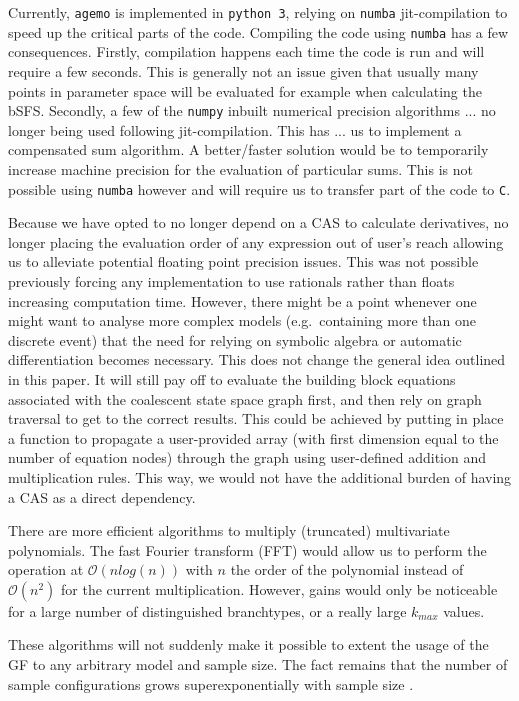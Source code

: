\documentclass[10pt, a4]{article}
\begin{document}
Currently, \texttt{agemo} is implemented in \texttt{python 3}, relying on \texttt{numba} jit-compilation to speed up the critical parts of the code. Compiling the code using \texttt{numba} has a few consequences. Firstly, compilation happens each time the code is run and will require a few seconds. This is generally not an issue given that usually many points in parameter space will be evaluated for example when calculating the bSFS. Secondly, a few of the \texttt{numpy} inbuilt numerical precision algorithms ... no longer being used following jit-compilation. This has ... us to implement a compensated sum algorithm.  A better/faster solution would be to temporarily increase machine precision for the evaluation of particular sums. This is not possible using \texttt{numba} however and will require us to transfer part of the code to \texttt{C}.

Because we have opted to no longer depend on a CAS to calculate derivatives, no longer placing the evaluation order of any expression out of user's reach allowing us to alleviate potential floating point precision issues. This was not possible previously forcing any implementation to use rationals rather than floats increasing computation time.
However, there might be a point whenever one might want to analyse more complex models (e.g.\ containing more than one discrete event) that the need for relying on symbolic algebra or automatic differentiation becomes necessary. This does not change the general idea outlined in this paper. It will still pay off to evaluate the building block equations associated with the coalescent state space graph first, and then rely on graph traversal to get to the correct results. This could be achieved by putting in place a function to propagate a user-provided array (with first dimension equal to the number of equation nodes) through the graph using user-defined addition and multiplication rules. This way, we would not have the additional burden of having a CAS as a direct dependency.

There are more efficient algorithms to multiply (truncated) multivariate polynomials. The fast Fourier transform (FFT) would allow us to perform the operation at $\mathcal{O}(n log(n))$ with $n$ the order of the polynomial instead of $\mathcal{O}(n^2)$ for the current multiplication. However, gains would only be noticeable for a large number of distinguished branchtypes, or a really large $k_{max}$ values. 
\newline

These algorithms will not suddenly make it possible to extent the usage of the GF to any arbitrary model and sample size. The fact remains that the number of sample configurations grows superexponentially with sample size \citep{Lohse2016}. %
\newline
\end{document}
